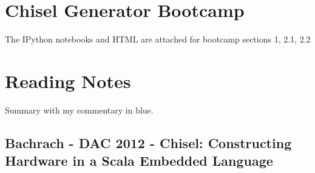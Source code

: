 \section{Chisel Generator Bootcamp}
The IPython notebooks and HTML are attached for bootcamp sections 1, 2.1, 2.2

\section{Reading Notes}
Summary with my commentary {\color{blue}in blue}.

\subsection{Bachrach - DAC 2012 - Chisel: Constructing Hardware in a Scala Embedded Language}

